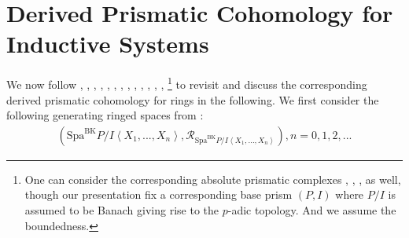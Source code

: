 \documentclass[12pt]{book}
\begin{document}
\chapter{Derived Prismatic Cohomology for Inductive Systems}


We now follow \cite{Grot1}, \cite{Grot2}, \cite{Grot3}, \cite{Grot4}, \cite{BK}, \cite{BBK}, \cite{BBBK}, \cite{BBM}, \cite{KKM}, \cite{T2}, \cite{Sch2}, \cite{BS}, \cite{BL}, \cite{Dr1}\footnote{One can consider the corresponding absolute prismatic complexes \cite{BS}, \cite{BL2}, \cite{BL}, \cite{Dr1} as well, though our presentation fix a corresponding base prism $(P,I)$ where $P/I$ is assumed to be Banach giving rise to the $p$-adic topology. And we assume the boundedness.  } to revisit and discuss the corresponding derived prismatic cohomology for rings in the following. We first consider the following generating ringed spaces from \cite{BK}:
\begin{align}
(\mathrm{Spa}^\mathrm{BK}P/I\left<X_1,...,X_n\right>,\mathcal{R}_{\mathrm{Spa}^\mathrm{BK}P/I\left<X_1,...,X_n\right>}),n=0,1,2,...
\end{align}
\end{document}
